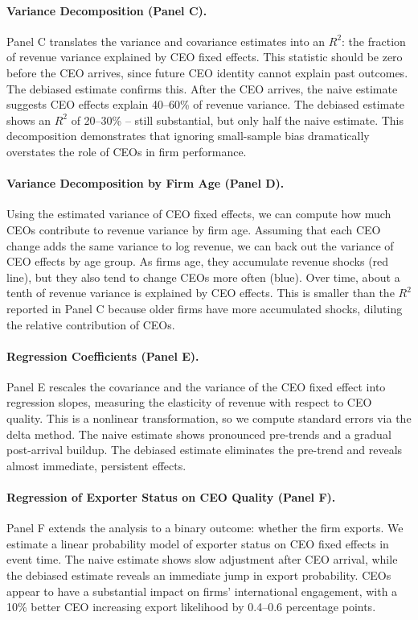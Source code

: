 \documentclass[11pt,a4paper]{article}
\begin{document}
\paragraph{Variance Decomposition (Panel C).} Panel C translates the variance and covariance estimates into an $R^2$: the fraction of revenue variance explained by CEO fixed effects. This statistic should be zero before the CEO arrives, since future CEO identity cannot explain past outcomes. The debiased estimate confirms this. After the CEO arrives, the naive estimate suggests CEO effects explain 40--60\% of revenue variance. The debiased estimate shows an $R^2$ of 20--30\% -- still substantial, but only half the naive estimate. This decomposition demonstrates that ignoring small-sample bias dramatically overstates the role of CEOs in firm performance.

\paragraph{Variance Decomposition by Firm Age (Panel D).} Using the estimated variance of CEO fixed effects, we can compute how much CEOs contribute to revenue variance by firm age. Assuming that each CEO change adds the same variance to log revenue, we can back out the variance of CEO effects by age group. As firms age, they accumulate revenue shocks (red line), but they also tend to change CEOs more often (blue). Over time, about a tenth of revenue variance is explained by CEO effects. This is smaller than the $R^2$ reported in Panel C because older firms have more accumulated shocks, diluting the relative contribution of CEOs.

\paragraph{Regression Coefficients (Panel E).} Panel E rescales the covariance and the variance of the CEO fixed effect into regression slopes, measuring the elasticity of revenue with respect to CEO quality. This is a nonlinear transformation, so we compute standard errors via the delta method. The naive estimate shows pronounced pre-trends and a gradual post-arrival buildup. The debiased estimate eliminates the pre-trend and reveals almost immediate, persistent effects. 

\paragraph{Regression of Exporter Status on CEO Quality (Panel F).} Panel F extends the analysis to a binary outcome: whether the firm exports. We estimate a linear probability model of exporter status on CEO fixed effects in event time. The naive estimate shows slow adjustment after CEO arrival, while the debiased estimate reveals an immediate jump in export probability. CEOs appear to have a substantial impact on firms' international engagement, with a 10\% better CEO increasing export likelihood by 0.4--0.6 percentage points.
\end{document}
